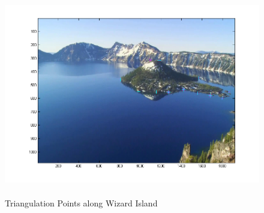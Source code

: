 \documentclass[11pt,psfig]{article}
\begin{document}
\begin{figure}[H]
\centering
\includegraphics[height=3.5in]{sfmResults1/photoLeft_wizardIslandPoints.png}
\caption{Triangulation Points along Wizard Island}
\end{figure}

\newpage
\end{document}
